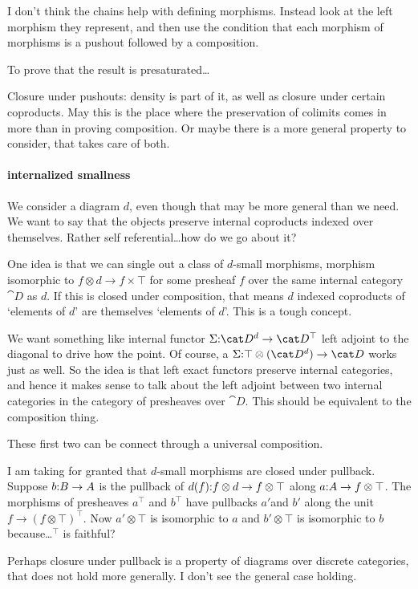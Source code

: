 \documentclass[csh.tex]{subfiles}
\begin{document}
I don't think the chains help with defining morphisms. Instead look at the left morphism they represent, and then use the condition that each morphism of morphisms is a pushout followed by a composition.

To prove that the result is presaturated\dots

Closure under pushouts: density is part of it, as well as closure under certain coproducts. May this is the place where the preservation of colimits comes in more than in proving composition. Or maybe there is a more general property to consider, that takes care of both.

\paragraph{internalized smallness}
We consider a diagram $d$, even though that may be more general than we need. We want to say that the objects preserve internal coproducts indexed over themselves. Rather self referential\dots how do we go about it?

One idea is that we can single out a class of $d$-small morphisms, morphism isomorphic to $f\otimes d\to f\times \top$ for some presheaf $f$ over the same internal category $\cat D$ as $d$. If this is closed under composition, that means $d$ indexed coproducts of `elements of $d$' are themselves `elements of $d$'. This is a tough concept.

We want something like internal functor $\Sigma\of \cat D^d \to \cat D^\top$ left adjoint to the diagonal to drive how the point. Of course, a $\Sigma\of \top\otimes(\cat D^d) \to \cat D$ works just as well. 
So the idea is that left exact functors preserve internal categories, and hence it makes sense to talk about the left adjoint between two internal categories in the category of presheaves over $\cat D$. This should be equivalent to the composition thing.

These first two can be connect through a universal composition. 

I am taking for granted that $d$-small morphisms are closed under pullback. Suppose $b\mathord : B\to A$ is the pullback of $d(f)\mathord : f\otimes d\to f\otimes \top$ along $a\mathord : A \to f\otimes \top$. The morphisms of presheaves $a^\top$ and $b^\top$ have pullbacks $a'$and $b'$ along the unit $f\to(f\otimes \top)^\top$. Now $a'\otimes \top$ is isomorphic to $a$ and $b'\otimes \top$ is isomorphic to $b$ because\dots $^\top$ is faithful?

Perhaps closure under pullback is a property of diagrams over discrete categories, that does not hold more generally. I don't see the general case holding.
\end{document}
